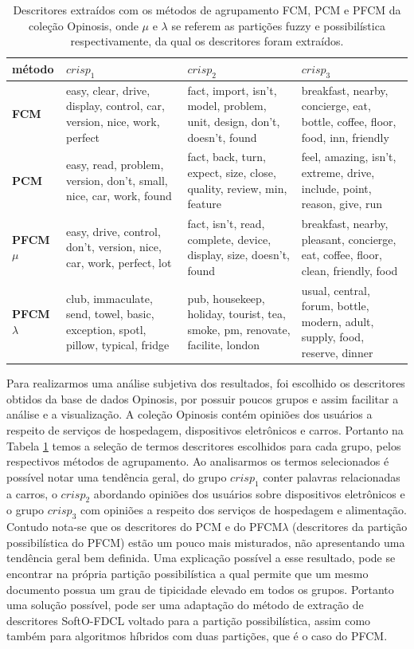 \begin{table}[!htp]
  \centering
  \begin{tabular}{ |l|p{4cm} | p{4cm} | p{4cm}|}
    \hline
    {\bf método} & $crisp_1$ & $crisp_2$ & $crisp_3$ \\
    \hline
    {\bf FCM} & easy, clear, drive, display, control, car, version, nice, work, perfect & fact,
    import, isn't, model, problem, unit, design, don't, doesn't, found & breakfast, nearby,
    concierge, eat, bottle, coffee, floor, food, inn, friendly \\
    \hline
    {\bf PCM} & easy, read, problem, version, don't, small, nice, car, work, found & fact, back,
    turn, expect, size, close, quality, review, min, feature & feel, amazing, isn't, extreme, drive,
    include, point, reason, give, run\\
    \hline
    {\bf PFCM $\mu$} & easy, drive, control, don't, version, nice, car, work, perfect, lot & fact,
    isn't, read, complete, device, display, size, doesn't, found & breakfast, nearby, pleasant,
    concierge, eat, coffee, floor, clean, friendly, food\\
    \hline
    {\bf PFCM $\lambda$} & club, immaculate, send, towel, basic, exception, spotl, pillow, typical,
    fridge & pub, housekeep, holiday, tourist, tea, smoke, pm, renovate, facilite, london & usual,
    central, forum, bottle, modern, adult, supply, food, reserve, dinner\\
    \hline
  \end{tabular}
  \caption{Descritores extraídos com os métodos de agrupamento FCM, PCM e PFCM da coleção Opinosis,
  onde $\mu$ e $\lambda$ se referem as partições fuzzy e possibilística respectivamente, da qual os
descritores foram extraídos.}
  \label{table:pfcmdescriptors}
\end{table}

Para realizarmos uma análise subjetiva dos resultados, foi escolhido os descritores obtidos da base
de dados Opinosis, por possuir poucos grupos e assim facilitar a análise e a visualização. A coleção
Opinosis contém opiniões dos usuários a respeito de serviços de hospedagem, dispositivos eletrônicos
e carros.  Portanto na Tabela \ref{table:pfcmdescriptors} temos a seleção de termos descritores
escolhidos para cada grupo, pelos respectivos métodos de agrupamento. Ao analisarmos os termos
selecionados é possível notar uma tendência geral, do grupo $crisp_1$ conter palavras relacionadas a
carros, o $crisp_2$ abordando opiniões dos usuários sobre dispositivos eletrônicos e o grupo
$crisp_3$ com opiniões a respeito dos serviços de hospedagem e alimentação. Contudo nota-se que os
descritores do PCM e do PFCM$\lambda$ (descritores da partição possibilística do PFCM) estão um
pouco mais misturados, não apresentando uma tendência geral bem definida. Uma explicação possível a
esse resultado, pode se encontrar na própria partição possibilística a qual permite que um mesmo
documento possua um grau de tipicidade elevado em todos os grupos. Portanto uma solução possível,
pode ser uma adaptação do método de extração de descritores SoftO-FDCL voltado para a partição
possibilística, assim como também para algoritmos híbridos com duas partições, que é o caso do PFCM.

